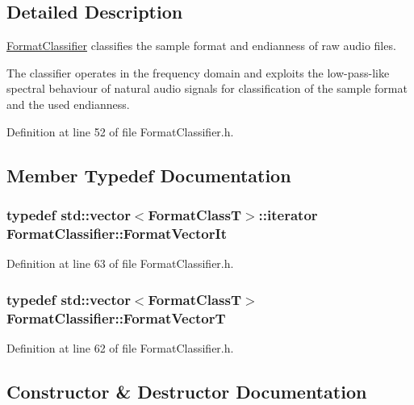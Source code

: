 \subsection{Detailed Description}
\hyperlink{class_format_classifier}{Format\+Classifier} classifies the sample format and endianness of raw audio files. 

The classifier operates in the frequency domain and exploits the low-\/pass-\/like spectral behaviour of natural audio signals for classification of the sample format and the used endianness. 

Definition at line 52 of file Format\+Classifier.\+h.



\subsection{Member Typedef Documentation}
\subsubsection[{\texorpdfstring{Format\+Vector\+It}{FormatVectorIt}}]{\setlength{\rightskip}{0pt plus 5cm}typedef std\+::vector$<${\bf Format\+ClassT}$>$\+::iterator {\bf Format\+Classifier\+::\+Format\+Vector\+It}}\hypertarget{class_format_classifier_a0f41cb1c1399ffa2a8cccf466869228a}{}\label{class_format_classifier_a0f41cb1c1399ffa2a8cccf466869228a}


Definition at line 63 of file Format\+Classifier.\+h.

\subsubsection[{\texorpdfstring{Format\+VectorT}{FormatVectorT}}]{\setlength{\rightskip}{0pt plus 5cm}typedef std\+::vector$<${\bf Format\+ClassT}$>$ {\bf Format\+Classifier\+::\+Format\+VectorT}}\hypertarget{class_format_classifier_ab1d40cc2906c7467afd2dbe19c1a32cd}{}\label{class_format_classifier_ab1d40cc2906c7467afd2dbe19c1a32cd}


Definition at line 62 of file Format\+Classifier.\+h.



\subsection{Constructor \& Destructor Documentation}
